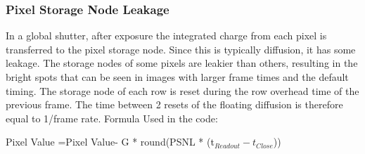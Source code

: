 
\subsubsection{Pixel Storage Node Leakage} %
In a global shutter, after exposure the integrated charge from each pixel is transferred to the pixel storage node. Since this is typically diffusion, it has some leakage. The storage nodes of some pixels are leakier than others, resulting in the bright spots that can be seen in images with larger frame times and the default timing.
The storage node of each row is reset during the row overhead time of the previous frame. The time between 2 resets of the floating diffusion is therefore equal to 1/frame rate.
Formula Used in the code:

 Pixel Value =Pixel Value- G * round(PSNL * (t$_{Readout} - t_{Close}$))